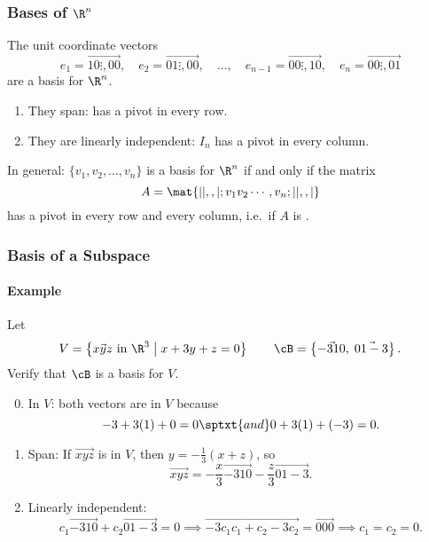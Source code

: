 
\begin{frame}
\frametitle{Bases of $\R^n$}

The unit coordinate vectors
\[ e_1 = \vec{1 0 \vdots, 0 0},\quad e_2 = \vec{0 1 \vdots, 0 0},\quad\ldots,\quad
   e_{n-1} = \vec{0 0 \vdots, 1 0},\quad e_n = \vec{0 0 \vdots, 0 1} \]
are a basis for $\R^n$.
\pause
\begin{enumerate}
\item They span:  has a pivot in every row.
\pause
{}
\pause
\item They are linearly independent: $I_n$ has a pivot in every column.
\end{enumerate}

\pause\medskip
\alert{In general:} $\{v_1,v_2,\ldots,v_n\}$ is a basis for $\R^n$ if and only
if the matrix 
\[ A = \mat{| | ,, |; v_1 v_2 \cdots, v_n; | | ,, |} \]
has a pivot in every row and every column,
i.e.\ if $A$ is .

\end{frame}



\begin{frame}
\frametitle{Basis of a Subspace}
\framesubtitle{Example}

\vskip-3mm
\begin{eg}
  Let\vskip-7mm
  \[ V = \left\{ \vec{x y z} \text{ in } \R^3\bigm| x + 3y + z = 0 \right\} \qquad 
  \cB = \left\{ \vec{-3 1 0},\;\vec{0 1 -3} \right\}. \]
  Verify that $\cB$ is a basis for $V$.

  \begin{webonly}
    \displayskips{3pt}
  \begin{enumerate}\setcounter{enumi}{-1}
  \item \alert{In $V$:} both vectors are in $V$ because
    \[ -3 + 3(1) + 0 = 0 \sptxt{and} 0 + 3(1) + (-3) = 0. \]
    
  \item \alert{Span:}
    If $\vec{x y z}$ is in $V$, then $y = -\frac 13(x+z)$, so
    \vskip-3mm
    \[ \vec{x y z} = -\frac x3\vec{-3 1 0} - \frac z3\vec{0 1 -3}. \]
    
  \item \alert{Linearly independent:}
    \[ c_1\vec{-3 1 0} + c_2\vec{0 1 -3} = 0
    \implies \vec{-3c_1 c_1+c_2 -3c_2} = \vec{0 0 0}
    \implies c_1 = c_2 = 0. \]
  \end{enumerate}
  \end{webonly}
\end{eg}

\end{frame}


